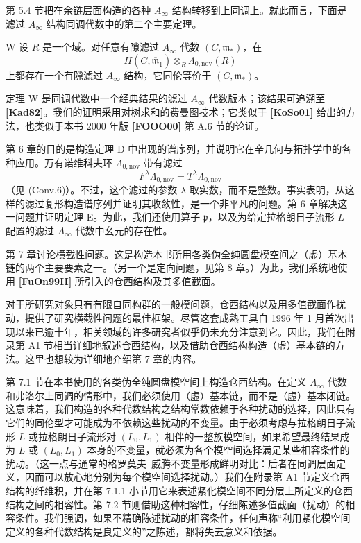 第 5.4 节把在余链层面构造的各种 $A_\infty$ 结构转移到上同调上。就此而言，下面是滤过 $A_\infty$ 结构同调代数中的第二个主要定理。

\begin{theorem}{W}\label{thm:intro-W}
设 $R$ 是一个域。对任意有隙滤过 $A_\infty$ 代数 $(C,\mathfrak m_*)$，在
\[
  H(\overline C,\overline{\mathfrak m}_1)
  \otimes_R\Lambda_{0,\mathrm{nov}}(R)
\]
上都存在一个有隙滤过 $A_\infty$ 结构，它同伦等价于 $(C,\mathfrak m_*)$。
\end{theorem}

定理 W 是同调代数中一个经典结果的滤过 $A_\infty$ 代数版本；该结果可追溯至 \textbf{[Kad82]}。我们的证明采用对树求和的费曼图技术；它类似于 \textbf{[KoSo01]} 给出的方法，也类似于本书 2000 年版 \textbf{[FOOO00]} 第 A.6 节的论证。

第 6 章的目的是构造定理 D 中出现的谱序列，并说明它在辛几何与拓扑学中的各种应用。万有诺维科夫环 $\Lambda_{0,\mathrm{nov}}$ 带有滤过
\[
  F^\lambda\Lambda_{0,\mathrm{nov}}
  =T^\lambda\Lambda_{0,\mathrm{nov}}
\]
（见 (Conv.6)）。不过，这个滤过的参数 $\lambda$ 取实数，而不是整数。事实表明，从这样的滤过复形构造谱序列并证明其收敛性，是一个非平凡的问题。第 6 章解决这一问题并证明定理 E。为此，我们还使用算子 $\mathfrak p$，以及为给定拉格朗日子流形 $L$ 配置的滤过 $A_\infty$ 代数中幺元的存在性。

第 7 章讨论横截性问题。这是构造本书所用各类伪全纯圆盘模空间之（虚）基本链的两个主要要素之一。（另一个是定向问题，见第 8 章。）为此，我们系统地使用 \textbf{[FuOn99II]} 所引入的仓西结构及其多值截面。

对于所研究对象只有有限自同构群的一般模问题，仓西结构以及用多值截面作扰动，提供了研究横截性问题的最佳框架。尽管这套成熟工具自 1996 年 1 月首次出现以来已逾十年，相关领域的许多研究者似乎仍未充分注意到它。因此，我们在附录第 A1 节相当详细地叙述仓西结构，以及借助仓西结构构造（虚）基本链的方法。这里也想较为详细地介绍第 7 章的内容。

第 7.1 节在本书使用的各类伪全纯圆盘模空间上构造仓西结构。在定义 $A_\infty$ 代数和弗洛尔上同调的情形中，我们必须使用（虚）基本链，而不是（虚）基本闭链。这意味着，我们构造的各种代数结构之结构常数依赖于各种扰动的选择，因此只有它们的同伦型才可能成为不依赖这些扰动的不变量。由于必须考虑与拉格朗日子流形 $L$ 或拉格朗日子流形对 $(L_0,L_1)$ 相伴的一整族模空间，如果希望最终结果成为 $L$ 或 $(L_0,L_1)$ 本身的不变量，就必须为各个模空间选择满足某些相容条件的扰动。（这一点与通常的格罗莫夫--威腾不变量形成鲜明对比：后者在同调层面定义，因而可以放心地分别为每个模空间选择扰动。）我们在附录第 A1 节定义仓西结构的纤维积，并在第 7.1.1 小节用它来表述紧化模空间不同分层上所定义的仓西结构之间的相容性。第 7.2 节则借助这种相容性，仔细陈述多值截面（扰动）的相容条件。我们强调，如果不精确陈述扰动的相容条件，任何声称“利用紧化模空间定义的各种代数结构是良定义的”之陈述，都将失去意义和依据。

